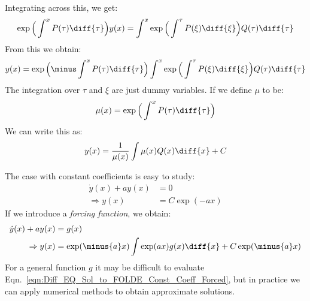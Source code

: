         Integrating across this, we get:
        \begin{equation}
            \exp\Big(\int^{x}P(\tau)\diff{\tau}\Big)y(x)
            =\int^{x}\exp\Big(\int^{\tau}P(\xi)\diff{\xi}\Big)
                Q(\tau)\diff{\tau}
        \end{equation}
        From this we obtain:
        \begin{equation}
            y(x)=\exp\Big(\minus\int^{x}P(\tau)\diff{\tau}\Big)
                \int^{x}\exp\Big(\int^{\tau}P(\xi)\diff{\xi}\Big)
                Q(\tau)\diff{\tau}
        \end{equation}
        The integration over $\tau$ and $\xi$ are just dummy variables.
        If we define $\mu$ to be:
        \begin{equation}
            \mu(x)=\exp\Big(\int^{x}P(\tau)\diff{\tau}\Big)    
        \end{equation}
        We can write this as:
        \begin{equation}
            y(x)=\frac{1}{\mu(x)}\int\mu(x)Q(x)\diff{x}+C
        \end{equation}
        \begin{lexample}
            The case with constant coefficients is easy to study:
            \begin{subequations}
                \begin{align}
                    \dot{y}(x)+ay(x)&=0\\
                    \Rightarrow{y(x)}&=C\exp(\minus{a}x)
                \end{align}
            \end{subequations}
            If we introduce a \textit{forcing function}, we obtain:
            \begin{subequations}
                \begin{align}
                    \dot{y}(x)+ay(x)&=g(x)\\
                    \label{eqn:Diff_EQ_Sol_to_FOLDE_Const_Coeff_Forced}
                    \Rightarrow{y(x)}
                    &=\exp(\minus{a}x)\int\exp(ax)g(x)\diff{x}
                    +C\exp(\minus{a}x)
                \end{align}
            \end{subequations}
            For a general function $g$ it may be
            difficult to evaluate
            Eqn.~\ref{eqn:Diff_EQ_Sol_to_FOLDE_Const_Coeff_Forced},
            but in practice we can apply numerical methods to obtain
            approximate solutions.
        \end{lexample}
